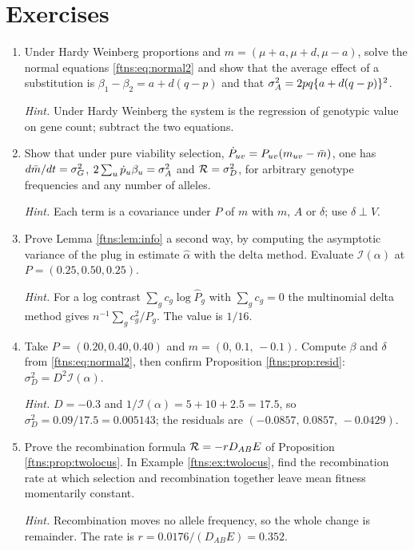 \section{Exercises}
\label{ftns:sec:exercises}

\begin{enumerate}[label=\arabic*.,leftmargin=*]
\item Under Hardy Weinberg proportions and $m=(\mu+a,\mu+d,\mu-a)$, solve the normal equations
\eqref{ftns:eq:normal2} and show that the average effect of a substitution is
$\beta_1-\beta_2=a+d(q-p)$ and that $\sigma^{2}_{A}=2pq\{a+d(q-p)\}^2$.

\emph{Hint.} Under Hardy Weinberg the system is the regression of genotypic value on gene count;
subtract the two equations.

\item Show that under pure viability selection, $\dot P_{uv}=P_{uv}(m_{uv}-\bar{m})$, one has
$d\bar{m}/dt=\sigma^2_G$, $2\sum_u\dot p_u\beta_u=\sigma^{2}_{A}$ and $\mathcal{R}=\sigma^2_D$, for arbitrary genotype
frequencies and any number of alleles.

\emph{Hint.} Each term is a covariance under $P$ of $m$ with $m$, $A$ or $\delta$; use
$\delta\perp V$.

\item Prove Lemma \ref{ftns:lem:info} a second way, by computing the asymptotic variance of the plug
in estimate $\hat\alpha$ with the delta method. Evaluate $\mathcal{I}(\alpha)$ at
$P=(0.25,0.50,0.25)$.

\emph{Hint.} For a log contrast $\sum_gc_g\log\hat P_g$ with $\sum_gc_g=0$ the multinomial delta
method gives $n^{-1}\sum_gc_g^2/P_g$. The value is $1/16$.

\item Take $P=(0.20,0.40,0.40)$ and $m=(0,\,0.1,\,-0.1)$. Compute $\beta$ and $\delta$ from
\eqref{ftns:eq:normal2}, then confirm Proposition \ref{ftns:prop:resid}: $\sigma^2_D=D^2\mathcal{I}(\alpha)$.

\emph{Hint.} $D=-0.3$ and $1/\mathcal{I}(\alpha)=5+10+2.5=17.5$, so $\sigma^2_D=0.09/17.5=0.005143$;
the residuals are $(-0.0857,\,0.0857,\,-0.0429)$.

\item Prove the recombination formula $\mathcal{R}=-rD_{AB}E$ of Proposition \ref{ftns:prop:twolocus}. In
Example \ref{ftns:ex:twolocus}, find the recombination rate at which selection and recombination
together leave mean fitness momentarily constant.

\emph{Hint.} Recombination moves no allele frequency, so the whole change is remainder. The rate is
$r=0.0176/(D_{AB}E)=0.352$.


\end{enumerate}
